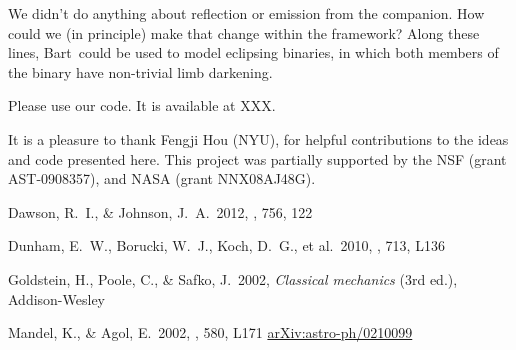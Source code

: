 \documentclass[12pt,preprint]{aastex}
\newcommand{\project}[1]{{\sffamily #1}}
\newcommand{\bart}{\project{Bart}}
\begin{document}
We didn't do anything about reflection or emission from the companion.
How could we (in principle) make that change within the framework?
Along these lines, \bart\ could be used to model eclipsing binaries,
in which both members of the binary have non-trivial limb darkening.

Please use our code.  It is available at XXX.

\acknowledgments It is a pleasure to thank
Fengji Hou (NYU),
for helpful contributions to the ideas and code presented here.
This project was partially supported by the NSF (grant AST-0908357), and NASA
(grant NNX08AJ48G).


\newcommand{\arxiv}[1]{\href{http://arxiv.org/abs/#1}{arXiv:#1}}
\begin{thebibliography}{}\raggedright

Dawson, R.~I., \& Johnson, J.~A.\ 2012, \apj, 756, 122

Dunham, E.~W., Borucki, W.~J., Koch, D.~G., et al.\ 2010, \apjl, 713, L136

Goldstein, H., Poole, C., \& Safko, J.\ 2002, \emph{Classical mechanics}
    (3rd ed.), Addison-Wesley

Mandel, K., \& Agol, E.\ 2002, \apjl, 580, L171 \arxiv{astro-ph/0210099}

\end{thebibliography}


\clearpage
\end{document}
